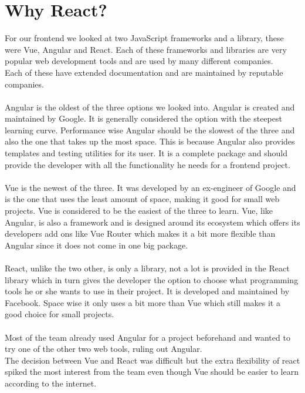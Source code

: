 \section{Why React?}
For our frontend we looked at two JavaScript frameworks and a library, these were Vue, Angular and React.
Each of these frameworks and libraries are very popular web development tools and are used by many different companies\cite{VueReactAngular}.
\\
Each of these have extended documentation and are maintained by reputable companies.
\\\\
Angular is the oldest of the three options we looked into. 
Angular is created and maintained by Google.
It is generally considered the option with the steepest learning curve.
Performance wise Angular should be the slowest of the three and also the one that takes up the most space.
This is because Angular also provides templates and testing utilities for its user.
It is a complete package and should provide the developer with all the functionality he needs for a frontend project.
\\\\
Vue is the newest of the three. 
It was developed by an ex-engineer of Google and is the one that uses the least amount of space, making it good for small web projects.
Vue is considered to be the easiest of the three to learn.
Vue, like Angular, is also a framework and is designed around its ecosystem which offers its developers add ons like Vue Router which makes it a bit more flexible than Angular since it does not come in one big package.
\\\\
React, unlike the two other, is only a library, not a lot is provided in the React library which in turn gives the developer the option to choose what programming tools he or she wants to use in their project.
It is developed and maintained by Facebook.
Space wise it only uses a bit more than Vue which still makes it a good choice for small projects.
\\\\
Most of the team already used Angular for a project beforehand and wanted to try one of the other two web tools, ruling out Angular.
\\
The decision between Vue and React was difficult but the extra flexibility of react spiked the most interest from the team even though Vue should be easier to learn according to the internet.

